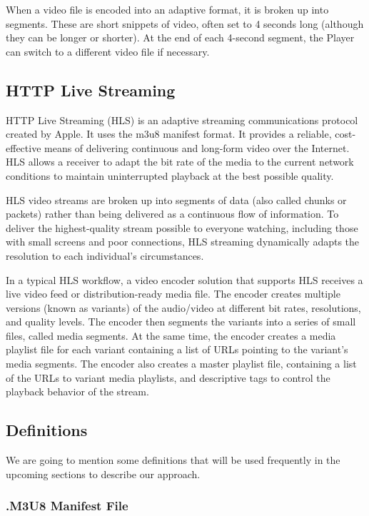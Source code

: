When a video file is encoded into an adaptive format, it is broken up into segments.
These are short snippets of video, often set to 4 seconds long (although they can be longer or shorter). At the end of each 4-second segment, the Player can switch to a different video file if necessary.

\subsection{HTTP Live Streaming}
HTTP Live Streaming (HLS) is an adaptive streaming communications protocol created by Apple. It uses the m3u8 manifest format. It provides a reliable, cost-effective means of delivering continuous and long-form video over the Internet. HLS allows a receiver to adapt the bit rate of the media to the current network conditions to maintain uninterrupted playback at the best possible quality.
  
HLS video streams are broken up into segments of data (also called chunks or packets) rather than being delivered as a continuous flow of information. To deliver the highest-quality stream possible to everyone watching, including those with small screens and poor connections, HLS streaming dynamically adapts the resolution to each individual’s circumstances. \cite{wowza}
   
In a typical HLS workflow, a video encoder solution that supports HLS receives a live video feed or distribution-ready media file. The encoder creates multiple versions (known as variants) of the audio/video at different bit rates, resolutions, and quality levels. The encoder then segments the variants into a series of small files, called media segments. At the same time, the encoder creates a media playlist file for each variant containing a list of URLs pointing to the variant’s media segments. The encoder also creates a master playlist file, containing a list of the URLs to variant media playlists, and descriptive tags to control the playback behavior of the stream. \cite{applehls} 

\subsection{Definitions}

We are going to mention some definitions \cite{refs} that will be used frequently in the upcoming sections to describe our approach. 

\subsubsection{.M3U8 Manifest File}

